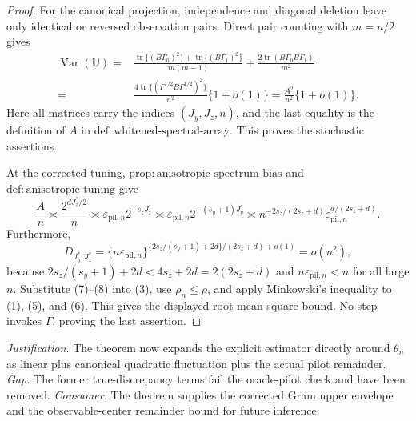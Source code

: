 \documentclass{article}
\begin{document}
\begin{proof}
For the canonical projection, independence and diagonal deletion leave only identical or reversed observation pairs. Direct pair counting with \(m=n/2\) gives
\[
\begin{split}
\operatorname{Var}(\mathbb U)
={}&\frac{\operatorname{tr}\{(B\Gamma_0)^2\}+\operatorname{tr}\{(B\Gamma_1)^2\}}{m(m-1)}
+\frac{2\operatorname{tr}(B\Gamma_0B\Gamma_1)}{m^2}\\
={}&\frac{4\operatorname{tr}\{(\Gamma^{1/2}B\Gamma^{1/2})^2\}}{n^2}\{1+o(1)\}
=\frac{A^2}{n^2}\{1+o(1)\}.                                   \tag{6}
\end{split}
\]
Here all matrices carry the indices \((J_y,J_z,n)\), and the last equality is the definition of \(A\) in \(\mathrm{def{:}whitened\text{-}spectral\text{-}array}\). This proves the stochastic assertions.

At the corrected tuning, \(\mathrm{prop{:}anisotropic\text{-}spectrum\text{-}bias}\) and \(\mathrm{def{:}anisotropic\text{-}tuning}\) give
\[
\frac A n\asymp\frac{2^{dJ_z^*/2}}n
\asymp\varepsilon_{\mathrm{pil},n}2^{-s_zJ_z^*}
\asymp\varepsilon_{\mathrm{pil},n}2^{-(s_y+1)J_y^*}
\asymp n^{-2s_z/(2s_z+d)}\varepsilon_{\mathrm{pil},n}^{d/(2s_z+d)}. \tag{7}
\]
Furthermore,
\[
D_{J_y^*,J_z^*}
=\{n\varepsilon_{\mathrm{pil},n}\}^{\{2s_z/(s_y+1)+2d\}/(2s_z+d)+o(1)}=o(n^2), \tag{8}
\]
because \(2s_z/(s_y+1)+2d<4s_z+2d=2(2s_z+d)\) and \(n\varepsilon_{\mathrm{pil},n}<n\) for all large \(n\).  Substitute (7)--(8) into (3), use \(\rho_n\le\rho\), and apply Minkowski's inequality to (1), (5), and (6). This gives the displayed root-mean-square bound. No step invokes \(\widehat\Gamma\), proving the last assertion.
\end{proof}
\par\smallskip\noindent \textit{Justification.} The theorem now expands the explicit estimator directly around \(\theta_n\) as linear plus canonical quadratic fluctuation plus the actual pilot remainder. \textit{Gap.} The former true-discrepancy terms fail the oracle-pilot check and have been removed. \textit{Consumer.} The theorem supplies the corrected Gram upper envelope and the observable-center remainder bound for future inference.
\end{document}
